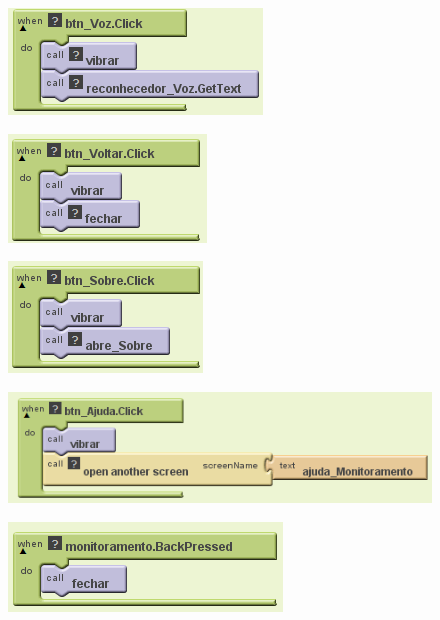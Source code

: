 \documentclass[portugues, brazil, a4paper,12pt]{article}
\begin{document}
\begin{figure}[H]
	\centering
	\includegraphics[scale=.8]{img/monitoramento/btVoz.png}
	
\end{figure}
\begin{figure}[H]
	\centering
	\includegraphics[scale=.8]{img/monitoramento/btVoltar.png}
	
\end{figure}
\begin{figure}[H]
	\centering
	\includegraphics[scale=.8]{img/monitoramento/btSobre.png}
	
\end{figure}
\begin{figure}[H]
	\centering
	\includegraphics[scale=.8]{img/monitoramento/btAjuda.png}
	
\end{figure}
\begin{figure}[H]
	\centering
	\includegraphics[scale=.8]{img/monitoramento/monitoramentoBack.png}
	
\end{figure}
\end{document}
